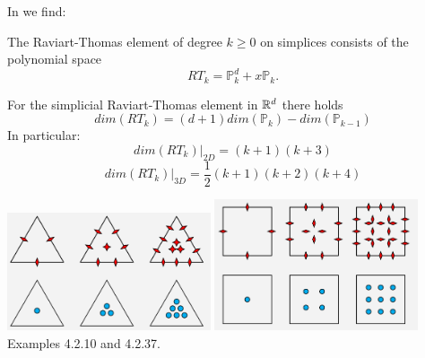 In \textcite{kanschat}  we find:
\begin{displayquote}
{\color{darkgray}

The Raviart-Thomas element of degree $k\ge 0$ on
simplices consists of the polynomial space
\[
RT_k = {\mathbb P}_k^d + x {\mathbb P}_k.
\]

For the simplicial Raviart-Thomas element in ${\mathbb{R}}^d$
there holds
\[
dim(RT_k) = (d+1) dim({\mathbb P}_k) - dim({\mathbb P}_{k-1})
\]
In particular:
\[
dim(RT_k)|_{2D} = (k+1)(k+3)
\]
\[
dim(RT_k)|_{3D} = \frac12(k+1)(k+2)(k+4)
\]


\begin{center}
\includegraphics[width=6cm]{images/pair_raviart-thomas/RT_kanschat_T}
\includegraphics[width=6cm]{images/pair_raviart-thomas/RT_kanschat_Q}\\
{\captionfont Examples 4.2.10 and 4.2.37.}
\end{center}

}
\end{displayquote}









